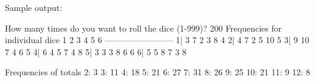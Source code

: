\begin{exercise}
Sample output:

\begin{stdout}
How many times do you want to roll the dice (1-999)? 200
Frequencies for individual dice
      1   2   3   4   5   6
    ------------------------
1|    3   7   2   3   8   4
2|    4   7   2   5  10   5
3|    9  10   7   4   6   5
4|    6   4   5   7   4   8
5|    3   3   3   8   6   6
6|    5   5   8   7   3   8

Frequencies of totals
 2:   3
 3:  11
 4:  18
 5:  21
 6:  27
 7:  31
 8:  26
 9:  25
10:  21
11:   9
12:   8
\end{stdout}

\end{exercise}
